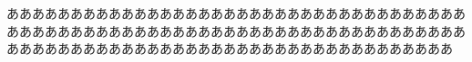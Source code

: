 \documentclass[autodetect-engine,dvipdfmx-if-dvi,ja=standard,UTF-8]{jsarticle}
\begin{document}
	
	
	あああああああああああああああああああああああああああああああああああああああああああああああああああああああああああああああああああああああああああああああああああああああああああああああああああああああああああ
	
	
	
	
	
	
	
	
	
	
	
	
	
	
	
	
	
\end{document}
